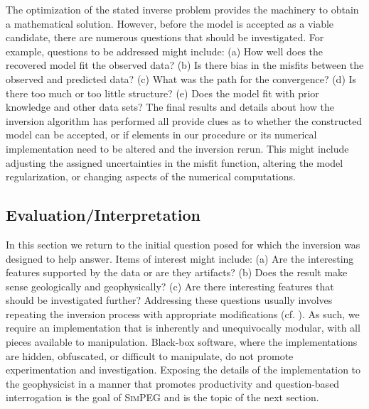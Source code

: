 \documentclass[preprint,review,3p,times,onecolumn,authoryear]{elsarticle}
\newcommand{\SimPEG}{\textsc{SimPEG}\xspace}
\begin{document}
The optimization of the stated inverse problem
provides the machinery to obtain a mathematical solution. However, before the model is
accepted as a viable candidate, there are numerous questions that
should be investigated.
For example, questions to be addressed might include:
(a) How well does the recovered model fit the observed data?
(b) Is there bias in the misfits between the observed and predicted data?
(c) What was the path for the convergence?
(d) Is there too much or too little structure?
(e) Does the model fit with prior knowledge and other data sets?
The final results and details about
how the inversion algorithm has performed all provide clues as
to whether the constructed model can be accepted, or if elements in
our procedure or its numerical implementation need to be altered and
the inversion rerun. This might include adjusting the assigned
uncertainties in the misfit function, altering the model regularization, or changing aspects of the numerical computations.


\subsection{Evaluation/Interpretation}

In this section we return to the initial question posed for which the inversion
was designed to help answer.
Items of interest might include:
(a) Are the interesting features supported by the data or are they artifacts?
(b) Does the result make sense geologically and geophysically?
(c) Are there interesting features that should be investigated further? %
Addressing these questions usually involves repeating the inversion process
with appropriate modifications (cf. \cite{DougTutorial,Pidlisecky2011,lines1988cooperative}).
As such, we require an implementation that is inherently and unequivocally modular,
with all pieces available to manipulation.
Black-box software, where the
implementations are hidden, obfuscated, or difficult to manipulate,
do not promote experimentation and investigation.
Exposing the details of the implementation to the geophysicist in
a manner that promotes productivity and question-based interrogation
is the goal of \SimPEG and is the topic of the next section.
\end{document}
